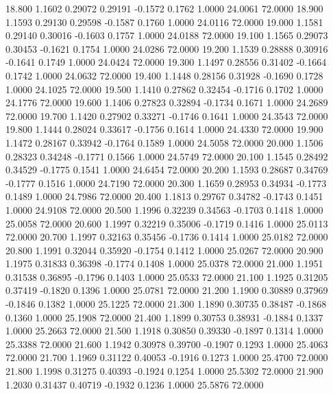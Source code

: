   18.800   1.1602   0.29072   0.29191  -0.1572   0.1762   1.0000  24.0061  72.0000
  18.900   1.1593   0.29130   0.29598  -0.1587   0.1760   1.0000  24.0116  72.0000
  19.000   1.1581   0.29140   0.30016  -0.1603   0.1757   1.0000  24.0188  72.0000
  19.100   1.1565   0.29073   0.30453  -0.1621   0.1754   1.0000  24.0286  72.0000
  19.200   1.1539   0.28888   0.30916  -0.1641   0.1749   1.0000  24.0424  72.0000
  19.300   1.1497   0.28556   0.31402  -0.1664   0.1742   1.0000  24.0632  72.0000
  19.400   1.1448   0.28156   0.31928  -0.1690   0.1728   1.0000  24.1025  72.0000
  19.500   1.1410   0.27862   0.32454  -0.1716   0.1702   1.0000  24.1776  72.0000
  19.600   1.1406   0.27823   0.32894  -0.1734   0.1671   1.0000  24.2689  72.0000
  19.700   1.1420   0.27902   0.33271  -0.1746   0.1641   1.0000  24.3543  72.0000
  19.800   1.1444   0.28024   0.33617  -0.1756   0.1614   1.0000  24.4330  72.0000
  19.900   1.1472   0.28167   0.33942  -0.1764   0.1589   1.0000  24.5058  72.0000
  20.000   1.1506   0.28323   0.34248  -0.1771   0.1566   1.0000  24.5749  72.0000
  20.100   1.1545   0.28492   0.34529  -0.1775   0.1541   1.0000  24.6454  72.0000
  20.200   1.1593   0.28687   0.34769  -0.1777   0.1516   1.0000  24.7190  72.0000
  20.300   1.1659   0.28953   0.34934  -0.1773   0.1489   1.0000  24.7986  72.0000
  20.400   1.1813   0.29767   0.34782  -0.1743   0.1451   1.0000  24.9108  72.0000
  20.500   1.1996   0.32239   0.34563  -0.1703   0.1418   1.0000  25.0058  72.0000
  20.600   1.1997   0.32219   0.35006  -0.1719   0.1416   1.0000  25.0113  72.0000
  20.700   1.1997   0.32163   0.35456  -0.1736   0.1414   1.0000  25.0182  72.0000
  20.800   1.1991   0.32044   0.35920  -0.1754   0.1412   1.0000  25.0267  72.0000
  20.900   1.1975   0.31833   0.36398  -0.1774   0.1408   1.0000  25.0378  72.0000
  21.000   1.1951   0.31538   0.36895  -0.1796   0.1403   1.0000  25.0533  72.0000
  21.100   1.1925   0.31205   0.37419  -0.1820   0.1396   1.0000  25.0781  72.0000
  21.200   1.1900   0.30889   0.37969  -0.1846   0.1382   1.0000  25.1225  72.0000
  21.300   1.1890   0.30735   0.38487  -0.1868   0.1360   1.0000  25.1908  72.0000
  21.400   1.1899   0.30753   0.38931  -0.1884   0.1337   1.0000  25.2663  72.0000
  21.500   1.1918   0.30850   0.39330  -0.1897   0.1314   1.0000  25.3388  72.0000
  21.600   1.1942   0.30978   0.39700  -0.1907   0.1293   1.0000  25.4063  72.0000
  21.700   1.1969   0.31122   0.40053  -0.1916   0.1273   1.0000  25.4700  72.0000
  21.800   1.1998   0.31275   0.40393  -0.1924   0.1254   1.0000  25.5302  72.0000
  21.900   1.2030   0.31437   0.40719  -0.1932   0.1236   1.0000  25.5876  72.0000
